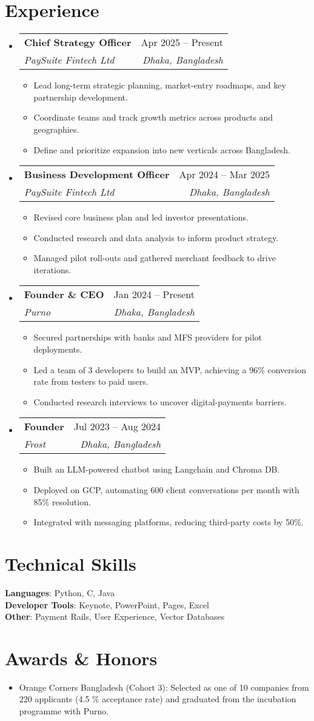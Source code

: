 \documentclass[letterpaper,11pt]{article}
\makeatletter
\newcommand{\resumeItem}[1]{
  \item\small{
    {#1 \vspace{-2pt}}
  }
}
\newcommand{\resumeSubheading}[4]{
  \vspace{-2pt}\item
    \begin{tabular*}{0.97\textwidth}[t]{l@{\extracolsep{\fill}}r}
      \textbf{#1} & #2 \\
      \textit{\small#3} & \textit{\small #4} \\
    \end{tabular*}\vspace{-7pt}
}
\newcommand{\resumeSubHeadingListStart}{\begin{itemize}[leftmargin=0.15in, label={}]}
\newcommand{\resumeSubHeadingListEnd}{\end{itemize}}
\newcommand{\resumeItemListStart}{\begin{itemize}}
\newcommand{\resumeItemListEnd}{\end{itemize}\vspace{-5pt}}
\makeatother
\begin{document}
\section{Experience}
  \resumeSubHeadingListStart
    \resumeSubheading
      {Chief Strategy Officer}{Apr 2025 -- Present}
      {PaySuite Fintech Ltd}{Dhaka, Bangladesh}
      \resumeItemListStart
        \resumeItem{Lead long-term strategic planning, market-entry roadmaps, and key partnership development.}
        \resumeItem{Coordinate teams and track growth metrics across products and geographies.}
        \resumeItem{Define and prioritize expansion into new verticals across Bangladesh.}
      \resumeItemListEnd
    \resumeSubheading
      {Business Development Officer}{Apr 2024 -- Mar 2025}
      {PaySuite Fintech Ltd}{Dhaka, Bangladesh}
      \resumeItemListStart
        \resumeItem{Revised core business plan and led investor presentations.}
        \resumeItem{Conducted research and data analysis to inform product strategy.}
        \resumeItem{Managed pilot roll-outs and gathered merchant feedback to drive iterations.}
      \resumeItemListEnd
    \resumeSubheading
      {Founder \& CEO}{Jan 2024 -- Present}
      {Purno}{Dhaka, Bangladesh}
      \resumeItemListStart
        \resumeItem{Secured partnerships with banks and MFS providers for pilot deployments.}
        \resumeItem{Led a team of 3 developers to build an MVP, achieving a 96\% conversion rate from testers to paid users.}
        \resumeItem{Conducted research interviews to uncover digital-payments barriers.}
      \resumeItemListEnd
    \resumeSubheading
      {Founder}{Jul 2023 -- Aug 2024}
      {Frost}{Dhaka, Bangladesh}
      \resumeItemListStart
        \resumeItem{Built an LLM-powered chatbot using Langchain and Chroma DB.}
        \resumeItem{Deployed on GCP, automating 600 client conversations per month with 85\% resolution.}
        \resumeItem{Integrated with messaging platforms, reducing third-party costs by 50\%.}
      \resumeItemListEnd
  \resumeSubHeadingListEnd

\section{Technical Skills}
 \begin{itemize}[leftmargin=0.15in, label={}]
    \small{\item{
     \textbf{Languages}: Python, C, Java \\
     \textbf{Developer Tools}: Keynote, PowerPoint, Pages, Excel \\
     \textbf{Other}: Payment Rails, User Experience, Vector Databases
    }}
 \end{itemize}

\section{Awards \& Honors}
  \resumeItemListStart
    \resumeItem{Orange Corners Bangladesh (Cohort 3): Selected as one of 10 companies from 220 applicants (4.5 \% acceptance rate) and graduated from the incubation programme with Purno.}
  \resumeItemListEnd

\end{document}
